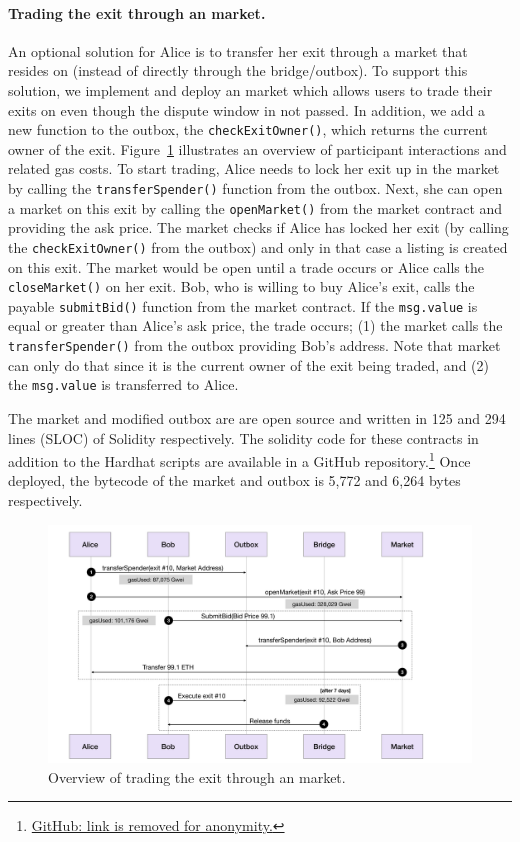 \paragraph{Trading the exit through an \layerone market.} An optional solution for Alice is to transfer her exit through a market that resides on \layerone (instead of directly through the bridge/outbox). To support this solution, we implement and deploy an \layerone market which allows users to trade their exits on \layerone even though the dispute window in not passed. In addition, we add a new function to the \arb \nitro outbox, the \texttt{checkExitOwner()}, which returns the current owner of the exit. Figure~\ref{fig:marketflow} illustrates an overview of participant interactions and related gas costs. To start trading, Alice needs to lock her exit up in the market by calling the \texttt{transferSpender()} function from the outbox. Next, she can open a market on this exit by calling the \texttt{openMarket()} from the market contract and providing the ask price. The market checks if Alice has locked her exit (by calling the \texttt{checkExitOwner()} from the outbox) and only in that case a listing is created on this exit. The market would be open until a trade occurs or Alice calls the \texttt{closeMarket()} on her exit. Bob, who is willing to buy Alice's exit, calls the payable \texttt{submitBid()} function from the market contract. If the \texttt{msg.value} is equal or greater than Alice's ask price, the trade occurs; (1) the market calls the \texttt{transferSpender()} from the outbox providing Bob's address. Note that market can only do that since it is the current owner of the exit being traded, and (2) the \texttt{msg.value} is transferred to Alice.

The market and modified outbox are are open source and written in 125 and 294 lines (SLOC) of Solidity respectively. The solidity code for these contracts in addition to the Hardhat scripts are available in a GitHub repository.\footnote{\href{https://}{GitHub: link is removed for anonymity.}} Once deployed, the bytecode of the market and outbox is 5,772 and 6,264 bytes respectively.

\begin{figure}[t]
	\includegraphics[width=1\textwidth]{figures/marketflow.pdf}
	\caption{Overview of trading the exit through an \layerone market.}
	\centering
	\label{fig:marketflow}
\end{figure}

